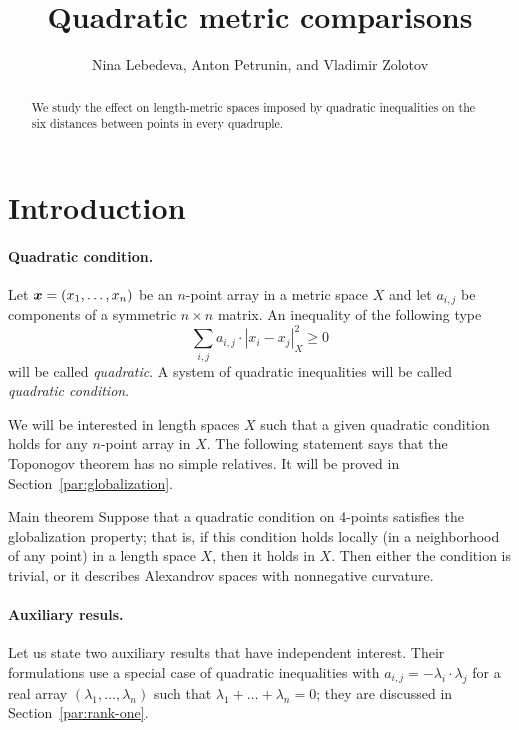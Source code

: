 \documentclass[a4paper,10pt]{article}
\def\thetitle{Quadratic metric comparisons}
\def\theauthors{Nina Lebedeva, Anton Petrunin, and Vladimir Zolotov}
\begin{document}

\title{\thetitle}
\author{\theauthors}
\date{}
\maketitle

\begin{abstract}
We study the effect on length-metric spaces imposed by quadratic inequalities on the six distances between points in every quadruple.
\end{abstract}

\section{Introduction}\label{par:quadratic-inq}

\paragraph{Quadratic condition.}
Let $\bm{x}\z=(x_1,\dots,x_n)$ be an $n$-point array in a metric space $X$ and let $a_{i,j}$ be components of a symmetric $n{\times}n$ matrix.
An inequality of the following type
\[\sum_{i,j}a_{i,j}\cdot|x_i-x_j|_X^2\ge 0\]
will be called \emph{quadratic}.
A system of quadratic inequalities will be called \emph{quadratic condition}.

We will be interested in length spaces $X$ such that a given quadratic condition holds for any $n$-point array in $X$.
The following statement says that the Toponogov theorem has no simple relatives.
It will be proved in Section~\ref{par:globalization}.

\begin{thm}{Main theorem}
Suppose that a quadratic condition on 4-points satisfies the globalization property;
that is, if this condition holds locally (in a neighborhood of any point) in a length space $X$, then it holds in $X$.
Then either the condition is trivial, or it describes Alexandrov spaces with nonnegative curvature.
\end{thm}


\paragraph{Auxiliary resuls.}
Let us state two auxiliary results that have independent interest.
Their formulations use a special case of quadratic inequalities
with $a_{i,j}=-\lambda_i\cdot\lambda_j$ for a real array $(\lambda_1,\dots, \lambda_n)$ such that $\lambda_1+\dots+\lambda_n=0$; they are discussed in Section~\ref{par:rank-one}.
\end{document}
